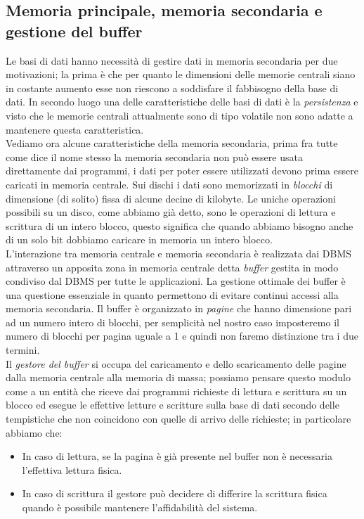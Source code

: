 \subsection{Memoria principale, memoria secondaria e gestione del buffer}
Le basi di dati hanno necessità di gestire dati in memoria secondaria per due motivazioni; la prima è che per quanto le dimensioni delle memorie centrali siano in costante aumento esse non riescono a soddisfare il fabbisogno della base di dati. In secondo luogo una delle caratteristiche delle basi di dati è la \emph{persistenza} e visto che le memorie centrali attualmente sono di tipo volatile non sono adatte a mantenere questa caratteristica.\\
Vediamo ora alcune caratteristiche della memoria secondaria, prima fra tutte come dice il nome stesso la memoria secondaria non può essere usata direttamente dai programmi, i dati per poter essere utilizzati devono prima essere caricati in memoria centrale. Sui dischi i dati sono memorizzati in \emph{blocchi} di dimensione (di solito) fissa di alcune decine di kilobyte. Le uniche operazioni possibili su un disco, come abbiamo già detto, sono le operazioni di lettura e scrittura di un intero blocco, questo significa che quando abbiamo bisogno anche di un solo bit dobbiamo caricare in memoria un intero blocco.\\
L'interazione tra memoria centrale e memoria secondaria è realizzata dai DBMS attraverso un apposita zona in memoria centrale detta \emph{buffer} gestita in modo condiviso dal DBMS per tutte le applicazioni. La gestione ottimale dei buffer è una questione essenziale in quanto permettono di evitare continui accessi alla memoria secondaria. Il buffer è organizzato in \emph{pagine} che hanno dimensione pari ad un numero intero di blocchi, per semplicità nel nostro caso imposteremo il numero di blocchi per pagina uguale a 1 e quindi non faremo distinzione tra i due termini.\\
Il \emph{gestore del buffer} si occupa del caricamento e dello scaricamento delle pagine dalla memoria centrale alla memoria di massa; possiamo pensare questo modulo come a un entità che riceve dai programmi richieste di lettura e scrittura su un blocco ed esegue le effettive letture e scritture sulla base di dati  secondo delle tempistiche che non coincidono con quelle di arrivo delle richieste; in particolare abbiamo che:
\begin{itemize}
  \item In caso di lettura, se la pagina è già presente nel buffer non è necessaria l'effettiva lettura fisica.
  \item In caso di scrittura il gestore può decidere di differire la scrittura fisica quando è possibile mantenere l'affidabilità del sistema.
\end{itemize}
